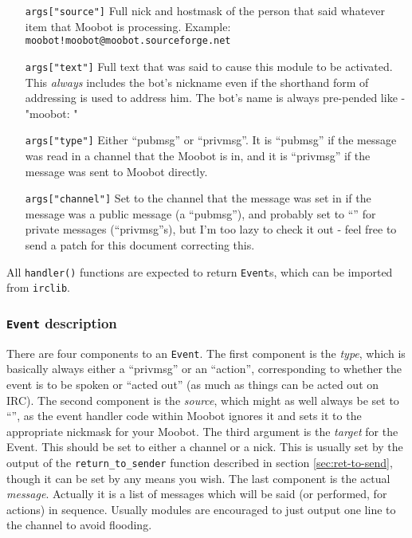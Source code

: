 \documentclass{article}[12pt]
\begin{document}
\begin{itemize}
	\item[\texttt{args["source"]}]	Full nick and hostmask of the person that
	said whatever item that Moobot is processing.  Example:
	\texttt{moobot!moobot@moobot.sourceforge.net}
	\item[\texttt{args["text"]}]	Full text that was said to cause this
	module to be activated.  This \emph{always} includes the bot's nickname
	even if the shorthand form of addressing is used to address him.  The
	bot's name is always pre-pended like - "moobot: "
	\item[\texttt{args["type"]}]	Either ``pubmsg'' or ``privmsg''.  It is
	``pubmsg'' if the message was read in a channel that the Moobot is in, and
	it is ``privmsg'' if the message was sent to Moobot directly.
	\item[\texttt{args["channel"]}]	Set to the channel that the message was
	set in if the message was a public message (a ``pubmsg''), and probably
	set to ``'' for private messages (``privmsg''s), but I'm too lazy to check
	it out - feel free to send a patch for this document correcting this.
\end{itemize}

All \texttt{handler()} functions are expected to return \texttt{Event}s, which
can be imported from \texttt{irclib}.

\subsubsection{\texttt{Event} description}
There are four components to an \texttt{Event}.  The first component is the
\emph{type}, which is basically always either a ``privmsg'' or an ``action'',
corresponding to whether the event is to be spoken or ``acted out'' (as much
as things can be acted out on IRC).  The second component is the \emph{source},
which might as well always be set to ``'', as the event handler code within
Moobot ignores it and sets it to the appropriate nickmask for your Moobot.
The third argument is the \emph{target} for the Event.  This should be set to
either a channel or a nick.  This is usually set by the output of the
\texttt{return\_to\_sender} function described in section
\ref{sec:ret-to-send}, though it can be set by any means you wish.  The last
component is the actual \emph{message}.  Actually it is a list of messages
which will be said (or performed, for actions) in sequence.  Usually modules
are encouraged to just output one line to the channel to avoid flooding.
\end{document}

